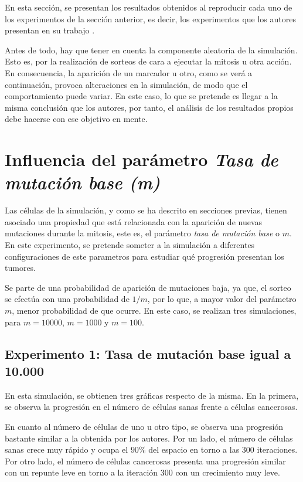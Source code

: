 En esta sección, se presentan los resultados obtenidos al reproducir cada uno de
los experimentos de la sección anterior, es decir, los experimentos que los autores
presentan en su trabajo \cite{jsantos-amonteagudo-1-2014}.

Antes de todo, hay que tener en cuenta la componente aleatoria de la simulación. Esto es, por
la realización de sorteos de cara a ejecutar la mitosis u otra acción. En consecuencia, la aparición
de un marcador u otro, como se verá a continuación, provoca alteraciones en la simulación, de modo que
el comportamiento puede variar. En este caso, lo que se pretende es llegar a la misma conclusión que los autores,
por tanto, el análisis de los resultados propios debe hacerse con ese objetivo en mente.

\section{Influencia del parámetro \textit{Tasa de mutación base (m)}}

Las células de la simulación, y como se ha descrito en secciones previas, tienen asociado una propiedad que está relacionada con la aparición
de nuevas mutaciones durante la mitosis, este es, el parámetro \textit{tasa de mutación base} o $m$. En este experimento,
se pretende someter a la simulación a diferentes configuraciones de este parametros para estudiar qué
progresión presentan los tumores.

Se parte de una probabilidad de aparición de mutaciones baja, ya que, el sorteo se efectúa con una probabilidad de
$1/m$, por lo que, a mayor valor del parámetro $m$, menor probabilidad de que ocurre. En este caso, se
realizan tres simulaciones, para $m=10000$, $m=1000$ y $m=100$.

\subsection{Experimento 1: Tasa de mutación base igual a 10.000}

En esta simulación, se obtienen tres gráficas respecto de la misma. En la primera, se observa la progresión
en el número de células sanas frente a células cancerosas.

En cuanto al número de células de uno u otro tipo, se observa una progresión bastante similar a la obtenida por los autores.
Por un lado, el número de células sanas crece muy rápido y ocupa el $90\%$ del espacio en torno a las $300$ iteraciones. Por otro lado,
el número de células cancerosas presenta una progresión similar con un repunte leve en torno a la iteración $300$ con un crecimiento muy leve.

